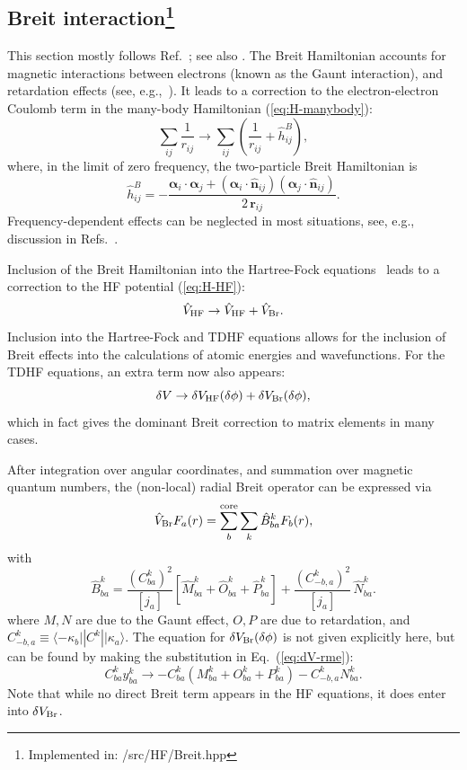 \documentclass[10pt,twocolumn,a4paper]{article}%
\newcommand{\bra}[1]{\ensuremath{\langle #1|}}	%
\newcommand{\ket}[1]{\ensuremath{|#1\rangle}}	%
\renewcommand{\v}[1]{\ensuremath{\boldsymbol{#1}}}		%
\newcommand{\vhat}[1]{\ensuremath{\hat{\boldsymbol{#1}}}}		%
\newcommand{\be}{\begin{equation}}
\newcommand{\ee}{\end{equation}}
\renewcommand{\a}{\ensuremath{\alpha}}
\renewcommand{\k}{\ensuremath{\kappa}}
\begin{document}
\subsection[Breit interaction]{Breit interaction\footnote{Implemented in: /src/HF/Breit.hpp}}


This section mostly follows Ref.~\cite{JohnsonBook2007}; see also \cite{Johnson1988a,Mann1971,Derevianko2001}.
The Breit Hamiltonian accounts for magnetic interactions between electrons (known as the Gaunt interaction), and retardation effects (see, e.g.,~\cite{BetheBook}).
It leads to a correction to the electron-electron Coulomb term in the many-body Hamiltonian (\ref{eq:H-manybody}):
\be
\sum_{ij}\frac{1}{r_{ij}}
\to
\sum_{ij}\left( \frac{1}{r_{ij}} + \hat h^B_{ij}\right),
\ee
where, in the limit of zero frequency, the two-particle Breit Hamiltonian is
\be
\hat h^B_{ij} = - \frac{\v{\a}_i\cdot\v{\a}_j + (\v{\a}_i\cdot\vhat{n}_{ij})(\v{\a}_j\cdot\vhat{n}_{ij})}{2\, \v{r}_{ij}}.
\ee
Frequency-dependent effects can be neglected in most situations, see, e.g., discussion in Refs.~\cite{BetheBook,JohnsonBook2007}.

Inclusion of the Breit Hamiltonian into the Hartree-Fock equations~\cite{Derevianko2001} leads to a correction to the HF potential (\ref{eq:H-HF}):
\be
\hat V_{\rm HF} \to  \hat V_{\rm HF}  + \hat V_{\rm Br} .
\ee
Inclusion into the Hartree-Fock and TDHF equations allows for the inclusion of Breit effects into the calculations of atomic energies and wavefunctions.
For the TDHF equations, an extra term now also appears:
\be
\delta V\to \delta V_{\rm HF}(\delta\phi)+\delta V_{\rm Br}(\delta\phi),
\ee
which in fact gives the dominant Breit correction to matrix elements in many cases.


After integration over angular coordinates, and summation over magnetic quantum numbers, the (non-local) radial Breit operator can be expressed via
\be\label{eq:HF_Breit}
\hat V_{\rm Br} F_a(r) = \sum_b^{\rm core}\sum_k \hat B^k_{ba}F_b(r),
\ee
with
\begin{equation}
\hat B^k_{ba} =   \frac{(C^k_{ba})^2 }{[j_a]}  \left[\hat M^k_{ba} + \hat O^k_{ba} + \hat P^k_{ba}\right]
 +
 \frac{(C^k_{-b,a})^2}{[j_a]} \, \hat N^k_{ba}.
\end{equation}
where
$M,N$ are due to the Gaunt effect, $O,P$ are due to retardation, and
 $C^k_{-b,a} \equiv \bra{-\k_b}|C^k|\ket{\k_a}$. %
The equation for $\delta V_{\rm Br}(\delta\phi)$ is not given explicitly here,
but can be found by making the substitution in Eq.~(\ref{eq:dV-rme}):
\[
C^k_{ba}y^k_{ba}\to -C^k_{ba}(M_{ba}^k+O_{ba}^k+P_{ba}^k)  -C^k_{-b,a}N_{ba}^k.
\]
Note that while no direct Breit term appears in the HF equations, it does enter into $\delta V_{\rm Br}$.
\end{document}
